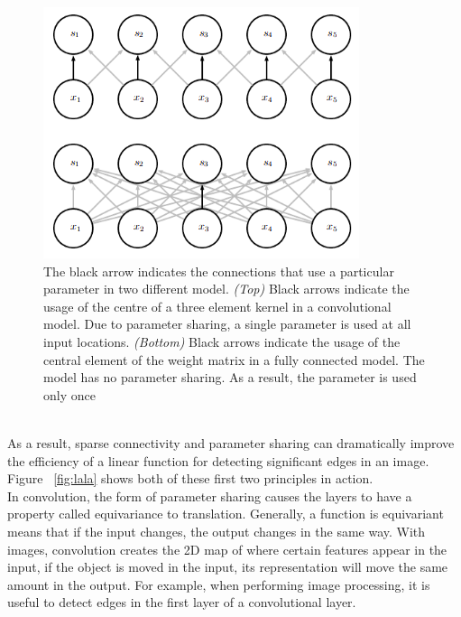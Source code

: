 \begin{figure}[th]
\centering
\includegraphics{Figures/ps}
\decoRule
\caption[The black arrow indicates the connections that use a particular parameter in two different model. \textit{(Top)} Black arrows indicate the usage of the centre of a three element kernel in a convolutional model. Due to parameter sharing, a single parameter is used at all input locations. \textit{(Bottom)} Black arrows indicate the usage of the central element of the weight matrix in a fully connected model. The model has no parameter sharing. As a result, the parameter is used only once \parencite{goodfellow2016deep}]{The black arrow indicates the connections that use a particular parameter in two different model. \textit{(Top)} Black arrows indicate the usage of the centre of a three element kernel in a convolutional model. Due to parameter sharing, a single parameter is used at all input locations. \textit{(Bottom)} Black arrows indicate the usage of the central element of the weight matrix in a fully connected model. The model has no parameter sharing. As a result, the parameter is used only once \parencite{goodfellow2016deep}}
\label{fig:la}
\end{figure}\\

As a result, sparse connectivity and parameter sharing can dramatically improve the efficiency of a linear function for detecting significant edges in an image. Figure ~\ref{fig:lala} shows both of these first two principles in action.\\

In convolution, the form of parameter sharing causes the layers to have a property called equivariance to translation. Generally, a function is equivariant means that if the input changes, the output changes in the same way. With images, convolution creates the 2D map of where certain features appear in the input, if the object is moved in the input, its representation will move the same amount in the output. For example, when performing image processing, it is useful to detect edges in the first layer of a convolutional layer.\\

